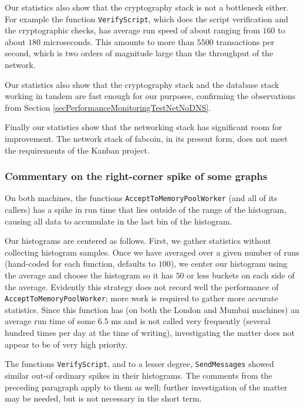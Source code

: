 \documentclass{article}
\begin{document}
Our statistics also show that the cryptography stack is not a bottleneck either. For example the function \verb|VerifyScript|, which does the script verification and the cryptographic checks, has average run speed of about ranging from $160$ to about $180$ microseconds. This amounts to more than $5500$ transactions per second, which is two orders of magnitude large than the throughput of the network.


Our statistics also show that the cryptography stack and the database stack working in tandem are fast enough for our purposes, confirming the observations from Section \ref{secPerformanceMonitoringTestNetNoDNS}.

Finally our statistics show that the networking stack has significant room for improvement. The network stack of fabcoin, in its present form, does not meet the requirements of the Kanban project.



\subsubsection{Commentary on the right-corner spike of some graphs}
On both machines, the functions \verb|AcceptToMemoryPoolWorker| (and all of its callers) has a spike in run time that lies outside of the range of the histogram, causing all data to accumulate in the last bin of the histogram. 

Our histograms are centered as follows. First, we gather statistics without collecting histogram samples. Once we have averaged over a given number of runs (hand-coded for each function, defaults to $100$), we center our histogram using the average and choose the histogram so it has $50$ or less buckets on each side of the average. Evidently this strategy does not record well the performance of  \verb|AcceptToMemoryPoolWorker|; more work is required to gather more accurate statistics. Since this function has (on both the London and Mumbai machines) an average run time of some $6.5$ ms and is not called very frequently (several hundred times per day at the time of writing), investigating the matter does not appear to be of very high priority. 


The functions \verb|VerifyScript|, and to a lesser degree, \verb|SendMessages| showed similar out-of ordinary spikes in their histograms. The comments from the preceding paragraph apply to them as well; further investigation of the matter may be needed, but is not necessary in the short term.
\end{document}
